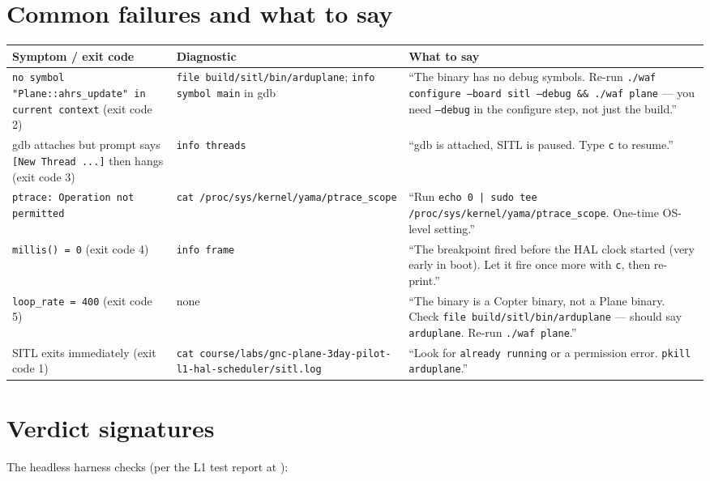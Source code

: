 \documentclass[a4paper,11pt,twoside]{article}
\begin{document}
\section*{Common failures and what to say}

\begin{center}\footnotesize
\begin{tabular}{|p{4.5cm}|p{4.0cm}|p{6.0cm}|}\hline
\textbf{Symptom / exit code} & \textbf{Diagnostic} & \textbf{What to say} \\ \hline
\texttt{no symbol "Plane::ahrs\_update" in current context} (exit code 2) & \texttt{file build/sitl/bin/arduplane}; \texttt{info symbol main} in gdb & ``The binary has no debug symbols. Re-run \texttt{./waf configure --board sitl --debug \&\& ./waf plane} --- you need \texttt{--debug} in the configure step, not just the build.'' \\ \hline
gdb attaches but prompt says \texttt{[New Thread ...]} then hangs (exit code 3) & \texttt{info threads} & ``gdb is attached, SITL is paused. Type \texttt{c} to resume.'' \\ \hline
\texttt{ptrace: Operation not permitted} & \texttt{cat /proc/sys/kernel/yama/ptrace\_scope} & ``Run \texttt{echo 0 | sudo tee /proc/sys/kernel/yama/ptrace\_scope}. One-time OS-level setting.'' \\ \hline
\texttt{millis() = 0} (exit code 4) & \texttt{info frame} & ``The breakpoint fired before the HAL clock started (very early in boot). Let it fire once more with \texttt{c}, then re-print.'' \\ \hline
\texttt{loop\_rate = 400} (exit code 5) & none & ``The binary is a Copter binary, not a Plane binary. Check \texttt{file build/sitl/bin/arduplane} --- should say \texttt{arduplane}. Re-run \texttt{./waf plane}.'' \\ \hline
SITL exits immediately (exit code 1) & \texttt{cat course/labs/gnc-plane-3day-pilot-l1-hal-scheduler/sitl.log} & ``Look for \texttt{already running} or a permission error. \texttt{pkill arduplane}.'' \\ \hline
\end{tabular}
\end{center}

\section*{Verdict signatures}

The headless harness checks (per the L1 test report at ):
\end{document}
